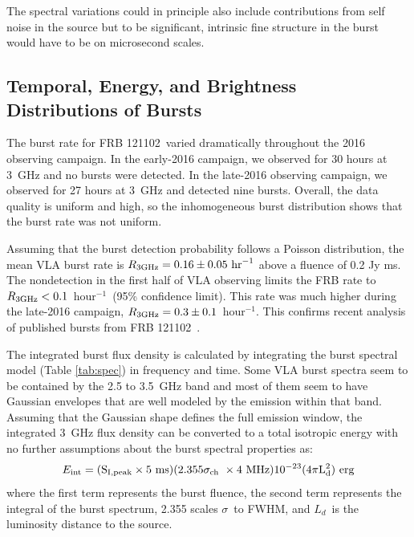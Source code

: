 \documentclass[twocolumn]{aastex61}
\newcommand{\frb}{FRB 121102}
\begin{document}
The spectral variations could in principle also include contributions from self noise in the source but to be significant, intrinsic fine structure in the burst would have to be on microsecond scales.  

\subsection{Temporal, Energy, and Brightness Distributions of Bursts}
\label{sec:disn}

The burst rate for \frb\ varied dramatically throughout the 2016 observing campaign. In the early-2016 campaign, we observed for 30 hours at 3~GHz and no bursts were detected. In the late-2016 observing campaign, we observed for 27 hours at 3~GHz and detected nine bursts. Overall, the data quality is uniform and high, so the inhomogeneous burst distribution shows that the burst rate was not uniform.

Assuming that the burst detection probability follows a Poisson distribution, the mean VLA burst rate is $R_{3\rm{GHz}}=0.16\pm0.05\ \rm{hr}^{-1}$ above a fluence of 0.2 Jy ms. The nondetection in the first half of VLA observing limits the FRB rate to $R_{3\rm{GHz}}<0.1$\ hour$^{-1}$\ (95\% confidence limit). This rate was much higher during the late-2016 campaign, $R_{3\rm{GHz}}=0.3\pm0.1$\ hour$^{-1}$. This confirms recent analysis of published bursts from \frb\ \citep{2017arXiv170504881O}.

The integrated burst flux density is calculated by integrating the burst spectral model (Table \ref{tab:spec}) in frequency and time. Some VLA burst spectra seem to be contained by the 2.5 to 3.5~GHz band and most of them seem to have Gaussian envelopes that are well modeled by the emission within that band. Assuming that the Gaussian shape defines the full emission window, the integrated 3~GHz flux density can be converted to a total isotropic energy with no further assumptions about the burst spectral properties as:
\begin{equation}
E_{\rm{int}} = (\rm{S}_{I,peak} \times 5\ \rm{ms}) ( 2.355 \sigma_{ch}\ \times 4\ \rm{MHz}) 10^{-23} (4\pi L_d^2)\ \rm{erg}
\end{equation}
\noindent where the first term represents the burst fluence, the second term represents the integral of the burst spectrum, 2.355 scales $\sigma$\ to FWHM, and $L_d$\ is the luminosity distance to the source.
\end{document}
